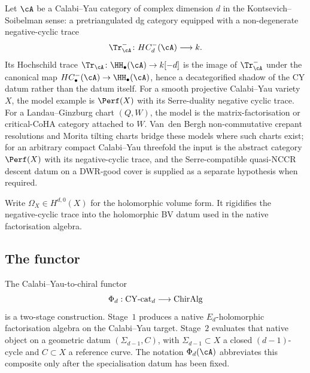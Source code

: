 Let $\cA$ be a Calabi--Yau category of complex dimension $d$ in the
Kontsevich--Soibelman sense: a pretriangulated dg category equipped
with a non-degenerate negative-cyclic trace
\[
 \Tr^-_\cA \colon HC^-_d(\cA) \longrightarrow k.
\]
Its Hochschild trace
\(\Tr_\cA \colon \HH_\bullet(\cA)\to k[-d]\) is the image of
\(\Tr^-_\cA\) under the canonical map \(HC^-_\bullet(\cA)\to
\HH_\bullet(\cA)\), hence a decategorified shadow of the CY datum rather
than the datum itself. For a smooth projective Calabi--Yau variety
$X$, the model example is $\Perf(X)$ with its Serre-duality negative
cyclic trace. For a Landau--Ginzburg chart $(Q,W)$, the model is the
matrix-factorisation or critical-CoHA category attached to $W$.
Van~den Bergh non-commutative crepant resolutions and Morita tilting
charts bridge these models where such charts exist; for an arbitrary
compact Calabi--Yau threefold the input is the abstract category
\(\Perf(X)\) with its negative-cyclic trace, and the Serre-compatible
quasi-NCCR descent datum on a DWR-good cover is supplied as a separate
hypothesis when required.

Write $\Omega_X\in H^{d,0}(X)$ for the holomorphic volume form. It
rigidifies the negative-cyclic trace into the holomorphic BV datum used
in the native factorisation algebra.

\subsection{The functor}
\label{wn:sec:platonic-intro-functor}

The Calabi--Yau-to-chiral functor
\[
\Phi_d: \mathrm{CY}\text{-cat}_d \longrightarrow \mathrm{ChirAlg}
\]
is a two-stage construction. Stage~$1$ produces a native
$E_d$-holomorphic factorisation algebra on the Calabi--Yau target.
Stage~$2$ evaluates that native object on a geometric datum
$(\Sigma_{d-1},C)$, with $\Sigma_{d-1}\subset X$ a closed
$(d-1)$-cycle and $C\subset X$ a reference curve. The notation
$\Phi_d(\cA)$ abbreviates this composite only after the specialisation
datum has been fixed.


